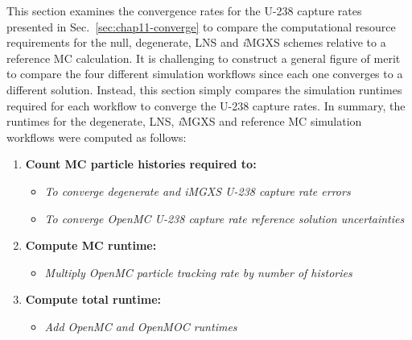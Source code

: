 This section examines the convergence rates for the U-238 capture rates presented in Sec.~\ref{sec:chap11-converge} to compare the computational resource requirements for the null, degenerate, \ac{LNS} and \textit{i}\ac{MGXS} schemes relative to a reference \ac{MC} calculation. It is challenging to construct a general figure of merit to compare the four different simulation workflows since each one converges to a different solution. Instead, this section simply compares the simulation runtimes required for each workflow to converge the U-238 capture rates. In summary, the runtimes for the degenerate, \ac{LNS}, \textit{i}\ac{MGXS} and reference \ac{MC} simulation workflows were computed as follows:

\vspace{6pt}

\begin{enumerate}[noitemsep,topsep=0pt]
\item \textbf{Count \ac{MC} particle histories required to:} 
\begin{itemize}[noitemsep,topsep=0pt,leftmargin=*]
  \item \textit{To converge degenerate and \textit{i}\ac{MGXS} U-238 capture rate errors}
  \item \textit{To converge OpenMC U-238 capture rate reference solution uncertainties}
\end{itemize}
\item \textbf{Compute \ac{MC} runtime:}
\begin{itemize}[noitemsep,topsep=0pt,leftmargin=*]
  \item \textit{Multiply OpenMC particle tracking rate by number of histories}
\end{itemize}
\item \textbf{Compute total runtime:}
\begin{itemize}[noitemsep,topsep=0pt,leftmargin=*]
  \item \textit{Add OpenMC and OpenMOC runtimes}
\end{itemize}
\end{enumerate}

\vspace{6pt}

